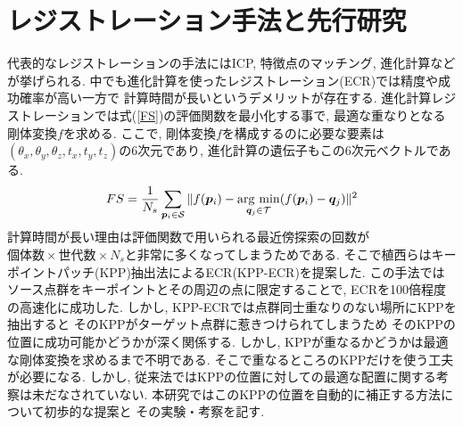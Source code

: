 \documentclass[twocolumn, 9pt, a4j, dvipdfmx]{jsarticle}
\newcommand{\argmin}{\mathop{\rm arg~min}\limits}
\begin{document}
\section{レジストレーション手法と先行研究}
代表的なレジストレーションの手法にはICP, 特徴点のマッチング, 進化計算など
が挙げられる. 
中でも進化計算を使ったレジストレーション(ECR)では精度や成功確率が高い一方で
計算時間が長いというデメリットが存在する. 
進化計算レジストレーションでは式(\ref{FS})の評価関数を最小化する事で, 
最適な重なりとなる剛体変換$f$を求める.
ここで, 剛体変換$f$を構成するのに必要な要素は
$(\theta_x, \theta_y, \theta_z ,t_x, t_y, t_z)$の6次元であり, 
進化計算の遺伝子もこの6次元ベクトルである. 
\begin{equation}
    \label{FS}
    FS = \frac{1}{N_s} \sum_{\bm{p}_i \in \mathcal{S}}
        \| f(\bm{p}_i) - \argmin_{\bm{q}_j \in\mathcal{T}}(f(\bm{p}_i) - \bm{q}_j) \|^2
\end{equation}
計算時間が長い理由は評価関数で用いられる最近傍探索の回数が
$個体数 \times 世代数 \times N_s$と非常に多くなってしまうためである. 
そこで植西ら\cite{KPP}はキーポイントパッチ(KPP)抽出法によるECR(KPP-ECR)を提案した.
この手法ではソース点群をキーポイントとその周辺の点に限定することで, 
ECRを100倍程度の高速化に成功した. 
しかし, 
KPP-ECRでは点群同士重なりのない場所にKPPを抽出すると
そのKPPがターゲット点群に惹きつけられてしまうため
そのKPPの位置に成功可能かどうかが深く関係する.
しかし, KPPが重なるかどうかは最適な剛体変換を求めるまで不明である. 
そこで重なるところのKPPだけを使う工夫が必要になる. 
しかし, 従来法ではKPPの位置に対しての最適な配置に関する考察は未だなされていない. 
本研究ではこのKPPの位置を自動的に補正する方法について初歩的な提案と
その実験・考察を記す. 
\end{document}
